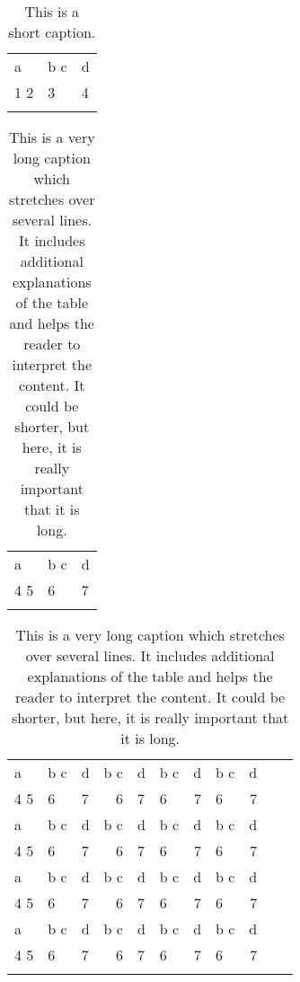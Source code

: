  

\lipsum[1]

\begin{table}
 \begin{tabular}{lll}
\lsptoprule
  a & b c & d\\
  1 2 & 3 & 4 \\
\lspbottomrule
 \end{tabular}
\caption{This is a short caption.}
\end{table}

\lipsum[2]

\begin{table}
 \begin{tabular}{lll}
\lsptoprule
  a & b c & d\\
  4 5 & 6 & 7 \\
\lspbottomrule
 \end{tabular}
\caption{This is a very long caption which stretches over several lines. It includes additional explanations of the table and helps the reader to interpret the content. It could be shorter, but here, it is really important that it is long.}
\end{table}


\lipsum[7]

\begin{table}
 \begin{tabular}{lllrllrlrll}
\lsptoprule
  a & b c & d& b c & d& b c & d& b c & d\\
  4 5 & 6 & 7 & 6 & 7 & 6 & 7 & 6 & 7 \\
  a & b c & d& b c & d& b c & d& b c & d\\
  4 5 & 6 & 7 & 6 & 7 & 6 & 7 & 6 & 7 \\
  a & b c & d& b c & d& b c & d& b c & d\\
  4 5 & 6 & 7 & 6 & 7 & 6 & 7 & 6 & 7 \\
  a & b c & d& b c & d& b c & d& b c & d\\
  4 5 & 6 & 7 & 6 & 7 & 6 & 7 & 6 & 7 \\
\lspbottomrule
 \end{tabular}
\caption{This is a very long caption which stretches over several lines. It includes additional explanations of the table and helps the reader to interpret the content. It could be shorter, but here, it is really important that it is long.}
\end{table}


\lipsum[8] 


